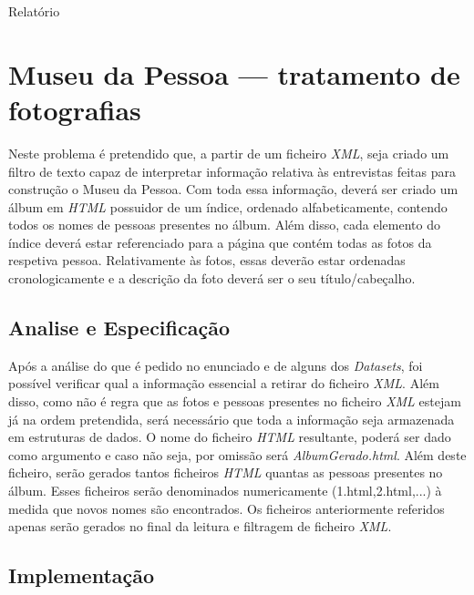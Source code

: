 Relatório


\chapter{Museu da Pessoa — tratamento de fotografias}
\label{cap:museu}
Neste problema é pretendido que, a partir de um ficheiro \emph{XML}, seja criado um filtro de texto capaz de interpretar informação relativa às entrevistas feitas para construção o Museu da Pessoa. Com toda essa informação, deverá ser criado um álbum em \emph{HTML} possuidor de um índice, ordenado alfabeticamente, contendo todos os nomes de pessoas presentes no álbum. Além disso, cada elemento do índice deverá estar referenciado para a página que contém todas as fotos da respetiva pessoa. Relativamente às fotos, essas deverão estar ordenadas cronologicamente e a descrição da foto deverá ser o seu título/cabeçalho.

\section{Analise e Especificação}
\label{seq:museu-ana}
Após a análise do que é pedido no enunciado e de alguns dos \emph{Datasets}, foi possível verificar qual a informação essencial a retirar do ficheiro \emph{XML}. Além disso, como não é regra que as fotos e pessoas presentes no ficheiro \emph{XML} estejam já na ordem pretendida, será necessário que toda a informação seja armazenada em estruturas de dados. O nome do ficheiro \emph{HTML} resultante, poderá ser dado como argumento e caso não seja, por omissão será \emph{AlbumGerado.html}. Além deste ficheiro, serão gerados tantos ficheiros \emph{HTML} quantas as pessoas presentes no álbum. Esses ficheiros serão denominados numericamente (1.html,2.html,...) à medida que novos nomes são encontrados. Os ficheiros anteriormente referidos apenas serão gerados no final da leitura e filtragem de ficheiro \emph{XML}.


\section{Implementação}
\label{seq:museu-imp}
